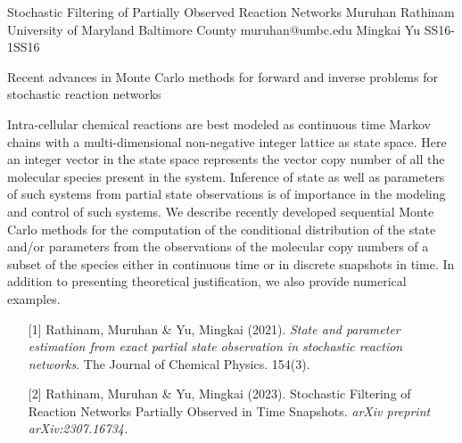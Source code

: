 \begin{talk}
  {Stochastic Filtering of Partially Observed Reaction Networks}%
  {Muruhan Rathinam}%
  {University of Maryland Baltimore County}%
  {muruhan@umbc.edu}%
  {Mingkai Yu}
{}{}{SS16-1}{SS16}

  {Recent advances in Monte Carlo methods for forward and inverse problems for stochastic reaction networks}%
			
Intra-cellular chemical reactions are best modeled as continuous time Markov chains
with a multi-dimensional non-negative integer lattice as state space. Here an
integer vector in the state space represents the vector copy number of all the 
molecular species present in the system. Inference of
state as well as parameters of such systems from partial state observations is of 
importance in the modeling and control of such systems. We describe recently developed
sequential Monte Carlo methods for the computation of the conditional distribution 
of the state and/or parameters from the observations of the molecular copy numbers of a subset of the 
species either in continuous time or in discrete snapshots in time. In addition to presenting theoretical justification, we also provide numerical examples. 
\medskip

\begin{enumerate}
	\item[{[1]}] Rathinam, Muruhan \& Yu, Mingkai (2021). {\it State and parameter estimation from exact partial state observation in stochastic reaction networks}. The Journal of Chemical Physics. 
 154(3).
	\item[{[2]}] Rathinam, Muruhan \& Yu, Mingkai (2023). Stochastic Filtering of Reaction Networks Partially Observed in Time Snapshots. {\it arXiv preprint arXiv:2307.16734.}
\end{enumerate}

\end{talk}

